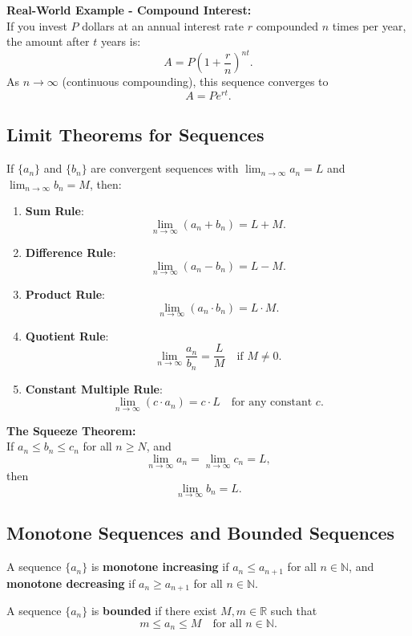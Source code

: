 \documentclass{article}
\begin{document}
\textbf{Real-World Example - Compound Interest:} \\
If you invest $P$ dollars at an annual interest rate $r$ compounded $n$ times per year, the amount after $t$ years is:
\[
A = P\left(1 + \frac{r}{n}\right)^{nt}.
\]
As $n \to \infty$ (continuous compounding), this sequence converges to 
\[
A = Pe^{rt}.
\]

\subsection{Limit Theorems for Sequences} \label{limit-theorems}

If $\{a_n\}$ and $\{b_n\}$ are convergent sequences with $\lim_{n \to \infty} a_n = L$ and $\lim_{n \to \infty} b_n = M$, then:
\begin{enumerate}[label=\textbf{\arabic*.}]
    \item \textbf{Sum Rule}: 
    \[
    \lim_{n \to \infty} (a_n + b_n) = L + M.
    \]
    \item \textbf{Difference Rule}: 
    \[
    \lim_{n \to \infty} (a_n - b_n) = L - M.
    \]
    \item \textbf{Product Rule}: 
    \[
    \lim_{n \to \infty} (a_n \cdot b_n) = L \cdot M.
    \]
    \item \textbf{Quotient Rule}: 
    \[
    \lim_{n \to \infty} \frac{a_n}{b_n} = \frac{L}{M} \quad \text{if } M \neq 0.
    \]
    \item \textbf{Constant Multiple Rule}: 
    \[
    \lim_{n \to \infty} (c \cdot a_n) = c \cdot L \quad \text{for any constant } c.
    \]
\end{enumerate}

\textbf{The Squeeze Theorem:} \\
If $a_n \leq b_n \leq c_n$ for all $n \geq N$, and 
\[
\lim_{n \to \infty} a_n = \lim_{n \to \infty} c_n = L,
\]
then 
\[
\lim_{n \to \infty} b_n = L.
\]

\subsection{Monotone Sequences and Bounded Sequences} \label{monotone-sequences}

A sequence $\{a_n\}$ is \textbf{monotone increasing} if $a_n \leq a_{n+1}$ for all $n \in \mathbb{N}$, and \textbf{monotone decreasing} if $a_n \geq a_{n+1}$ for all $n \in \mathbb{N}$.

A sequence $\{a_n\}$ is \textbf{bounded} if there exist $M, m \in \mathbb{R}$ such that 
\[
m \leq a_n \leq M \quad \text{for all } n \in \mathbb{N}.
\]
\end{document}
